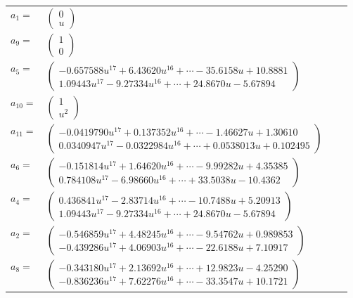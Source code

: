 \documentclass[1p]{elsarticle_modified}
\theoremstyle{definition}
\begin{document}
\begin{tabular}{m{7pt} m{180pt} m{7pt} m{180pt} }
\flushright $a_{1}=$&$\begin{pmatrix}0\\u\end{pmatrix}$ \\
\flushright $a_{9}=$&$\begin{pmatrix}1\\0\end{pmatrix}$ \\
\flushright $a_{5}=$&$\begin{pmatrix}-0.657588 u^{17}+6.43620 u^{16}+\cdots-35.6158 u+10.8881\\1.09443 u^{17}-9.27334 u^{16}+\cdots+24.8670 u-5.67894\end{pmatrix}$ \\
\flushright $a_{10}=$&$\begin{pmatrix}1\\u^2\end{pmatrix}$ \\
\flushright $a_{11}=$&$\begin{pmatrix}-0.0419790 u^{17}+0.137352 u^{16}+\cdots-1.46627 u+1.30610\\0.0340947 u^{17}-0.0322984 u^{16}+\cdots+0.0538013 u+0.102495\end{pmatrix}$ \\
\flushright $a_{6}=$&$\begin{pmatrix}-0.151814 u^{17}+1.64620 u^{16}+\cdots-9.99282 u+4.35385\\0.784108 u^{17}-6.98660 u^{16}+\cdots+33.5038 u-10.4362\end{pmatrix}$ \\
\flushright $a_{4}=$&$\begin{pmatrix}0.436841 u^{17}-2.83714 u^{16}+\cdots-10.7488 u+5.20913\\1.09443 u^{17}-9.27334 u^{16}+\cdots+24.8670 u-5.67894\end{pmatrix}$ \\
\flushright $a_{2}=$&$\begin{pmatrix}-0.546859 u^{17}+4.48245 u^{16}+\cdots-9.54762 u+0.989853\\-0.439286 u^{17}+4.06903 u^{16}+\cdots-22.6188 u+7.10917\end{pmatrix}$ \\
\flushright $a_{8}=$&$\begin{pmatrix}-0.343180 u^{17}+2.13692 u^{16}+\cdots+12.9823 u-4.25290\\-0.836236 u^{17}+7.62276 u^{16}+\cdots-33.3547 u+10.1721\end{pmatrix}$ \\

\end{tabular}
\end{document}
